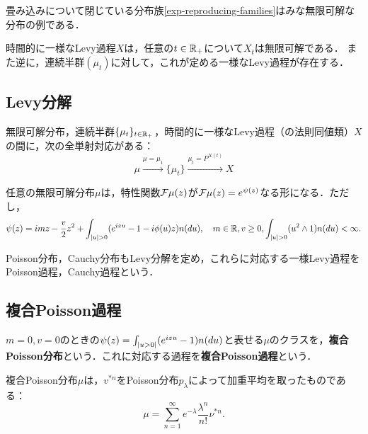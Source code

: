 \documentclass[uplatex,dvipdfmx]{jsreport}
\begin{document}
\begin{example}
    畳み込みについて閉じている分布族\ref{exp-reproducing-families}はみな無限可解な分布の例である．
\end{example}

\begin{example}
    時間的に一様なLevy過程$X$は，任意の$t\in\mathbb{R}_+$について$X_t$は無限可解である．
    また逆に，連続半群$(\mu_t)$に対して，これが定める一様なLevy過程が存在する．
\end{example}

\subsection{Levy分解}

\begin{tcolorbox}[colframe=ForestGreen, colback=ForestGreen!10!white,breakable,colbacktitle=ForestGreen!40!white,coltitle=black,fonttitle=\bfseries\sffamily,
title=]
    無限可解分布，連続半群$\{\mu_t\}_{t\in\mathbb{R}_+}$，時間的に一様なLevy過程（の法則同値類）$X$の間に，次の全単射対応がある：
    \[\mu\xrightarrow{\mu=\mu_1}\{\mu_t\}\xrightarrow{\mu_t=P^{X(t)}}X\]
\end{tcolorbox}

\begin{theorem}[無限可解分布のLevy分解定理]
    任意の無限可解分布$\mu$は，特性関数$\mathcal{F}\mu(z)$が$\mathcal{F}\mu(z)=e^{\psi(z)}$なる形になる．ただし，
    \[\psi(z)=imz-\frac{v}{2}z^2+\int_{\lvert u\rvert>0}(e^{izu}-1-i\phi(u)z)n(du),\quad m\in\mathbb{R},v\ge0,\int_{\lvert u\rvert>0}(u^2\land 1)n(du)<\infty.\]
\end{theorem}

\begin{definition}
    Poisson分布，Cauchy分布もLevy分解を定め，これらに対応する一様Levy過程をPoisson過程，Cauchy過程という．
\end{definition}

\subsection{複合Poisson過程}

\begin{definition}
        $m=0,v=0$のときの$\psi(z)=\int_{\lvert u>0\rvert}(e^{izu}-1)n(du)$と表せる$\mu$のクラスを，\textbf{複合Poisson分布}という．これに対応する過程を\textbf{複合Poisson過程}という．
\end{definition}

\begin{lemma}
    複合Poisson分布$\mu$は，$v^{*n}$をPoisson分布$p_\lambda$によって加重平均を取ったものである：
    \[\mu=\sum^\infty_{n=1}e^{-\lambda}\frac{\lambda^n}{n!}\nu^{*n}.\]
\end{lemma}
\end{document}
